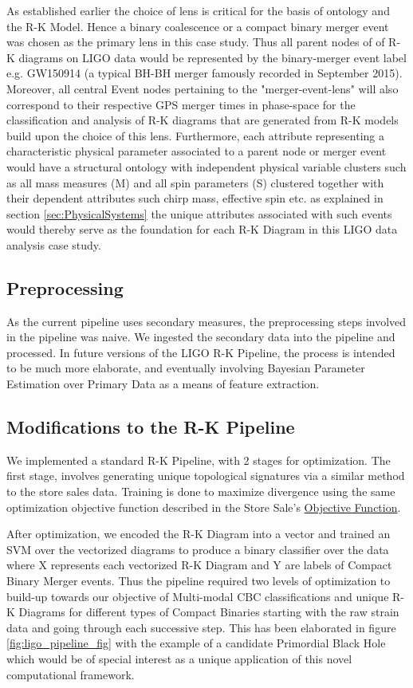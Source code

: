     As established earlier the choice of lens is critical for the basis of ontology and the R-K Model. Hence a binary coalescence or a compact binary merger event was chosen as the primary lens in this case study. Thus all parent nodes of of R-K diagrams on LIGO data would be represented by the binary-merger event label e.g. GW150914 (a typical BH-BH merger famously recorded in September 2015). Moreover, all central Event nodes pertaining to the "merger-event-lens" will also correspond to their respective GPS merger times in phase-space for the classification and analysis of R-K diagrams that are generated from R-K models build upon the choice of this lens. Furthermore, each attribute representing a characteristic physical parameter associated to a parent node or merger event would have a structural ontology with independent physical variable clusters such as all mass measures (M) and all spin parameters (S) clustered together with their dependent attributes such chirp mass, effective spin etc. as explained in section \ref{sec:PhysicalSystems}
    the unique attributes associated with such events would thereby serve as the  foundation for each R-K Diagram in this LIGO data analysis case study.

    \subsection{Preprocessing}

    As the current pipeline uses secondary measures, the preprocessing steps involved in the pipeline was naive. We ingested the secondary data into the pipeline and processed. In future versions of the LIGO R-K Pipeline, the process is intended to be much more elaborate, and eventually involving Bayesian Parameter Estimation over Primary Data as a means of feature extraction.

    \subsection{Modifications to the R-K Pipeline}

    We implemented a standard R-K Pipeline, with 2 stages for optimization. The first stage, involves generating unique topological signatures via a similar method to the store sales data. Training is done to maximize divergence using the same optimization objective function described in the Store Sale's \hyperref[sec:ObjectiveFunction]{Objective Function}.

    After optimization, we encoded the R-K Diagram into a vector and trained an SVM over the vectorized diagrams to produce a binary classifier over the data where X represents each vectorized R-K Diagram and Y are labels of  Compact Binary Merger events. Thus the pipeline required two levels of optimization to build-up towards our objective of Multi-modal CBC classifications and unique R-K Diagrams for different types of Compact Binaries starting with the raw strain data and going through each successive step. This has been elaborated in figure \ref{fig:ligo_pipeline_fig} with the example of a candidate Primordial Black Hole which would be of special interest as a unique application of this novel computational framework.
    
